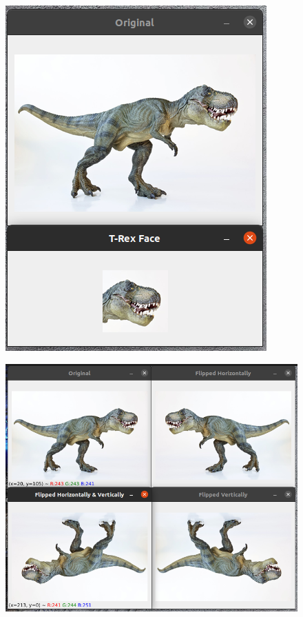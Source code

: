 \documentclass[12pt,letterpaper]{article}
\begin{document}
\begin{multicols}{2}
\begin{figure}[H]
\centering
\includegraphics[width = \columnwidth]{Resultado_ch6_4.png}
\end{figure}

\begin{figure}[H]
\centering
\includegraphics[width = \columnwidth]{Resultado_ch6_5.png}
\end{figure}


\end{multicols}
\end{document}
